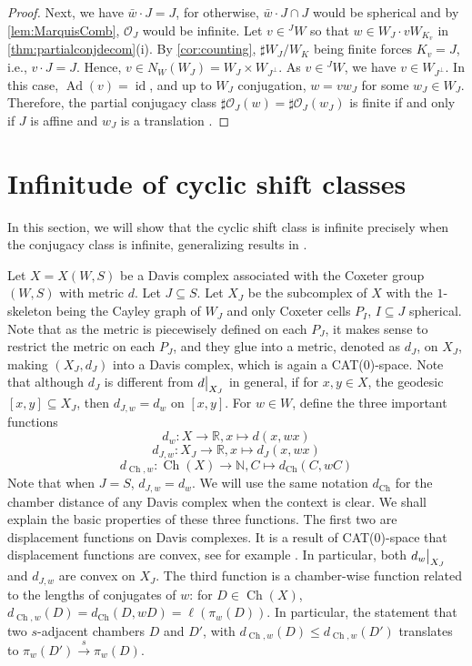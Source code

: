 \documentclass[a4paper, reqno, 14pt]{amsart}
\def\subset{\subseteq}
\def\co{\mathcal{O}}
\DeclareMathOperator{\Ad}{Ad}
\DeclareMathOperator{\Ch}{Ch}
\DeclareMathOperator{\id}{id}
\theoremstyle{definition}
\theoremstyle{remark}
\numberwithin{equation}{section}
\numberwithin{thm}{section}
\newcommand\restr[2]{\left.\kern-\nulldelimiterspace #1 \vphantom{\big|} \right|_{#2}}
\begin{document}
\begin{proof}
        Next, we have $\bar{w}\cdot J= J$, for otherwise, $\bar{w}\cdot J\cap J$ would be spherical and by \cref{lem:MarquisComb}, $\co_J$ would be infinite. Let $v\in {}^JW$ so that $w\in W_J\cdot vW_{K_v}$ in \cref{thm:partialconjdecom}(i). By \cref{cor:counting},  $\sharp W_J /W_K$ being finite forces $K_v=J$, i.e., $v\cdot J=J$. Hence, $v\in N_W(W_J)=W_J \times W_{J^\perp}$. As $v\in {}^JW$, we have $v\in W_{J^\perp}$. In this case, $\Ad(v)=\id$, and up to $W_J$ conjugation, $w=vw_J$ for some $w_J\in W_J$. Therefore, the partial conjugacy class $\sharp \co_J(w)=\sharp \co_J(w_J)$ is finite if and only if $J$ is affine and $w_J$ is a translation \cite[lemma 4.6]{marquis2024centre}.
        \end{proof}

    \section{Infinitude of cyclic shift classes}
        In this section, we will show that the cyclic shift class is infinite precisely when the conjugacy class is infinite, generalizing results in \cite[Section 4]{marquis2024centre}.
        
        Let $X=X(W,S)$ be a Davis complex associated with the Coxeter group $(W,S)$ with metric $d$. Let $J\subset S$. Let $X_J$ be the subcomplex of $X$ with the $1$-skeleton being the Cayley graph of $W_J$ and only Coxeter cells $P_I$, $I\subset J$ spherical. Note that as the metric is piecewisely defined on each $P_J$, it makes sense to restrict the metric on each $P_J$, and they glue into a metric, denoted as $d_J$, on $X_J$, making $(X_J,d_J)$ into a Davis complex, which is again a CAT($0$)-space. Note that although $d_J$ is different from $\restr{d}{X_J}$ in general, if for $x,y\in X$, the geodesic $[x,y]\subset X_J$, then $d_{J,w}=d_w$ on $[x,y]$. For $w\in W$, define the three important functions 
        $$d_w:X\to \mathbb{R}, x\mapsto d(x,wx)$$
        $$d_{J,w}:X_J\to \mathbb{R}, x\mapsto d_J(x,wx)$$ $$d_{\Ch,w}:\Ch(X)\to \mathbb{N}, C\mapsto d_{\Ch}(C,wC)$$
        Note that when $J=S$, $d_{J,w}=d_w$. We will use the same notation $d_{\Ch}$ for the chamber distance of any Davis complex when the context is clear. We shall explain the basic properties of these three functions.
        The first two are displacement functions on Davis complexes. It is a result of CAT($0$)-space that displacement functions are convex, see for example \cite[II, 6.2(3)]{bridson2013metric}. In particular, both $\restr{d_w}{X_J}$ and $d_{J,w}$ are convex on $X_J$. The third function is a chamber-wise function related to the lengths of conjugates of $w$: for $D\in \Ch(X)$, $d_{\Ch,w}(D)=d_{\Ch}(D,wD)=\ell(\pi_w(D))$. In particular, the statement that two $s$-adjacent chambers $D$ and $D'$, with $d_{\Ch,w}(D)\leq d_{\Ch,w}(D')$ translates to $\pi_w(D')\xrightarrow{s} \pi_w(D)$. 
\end{document}
